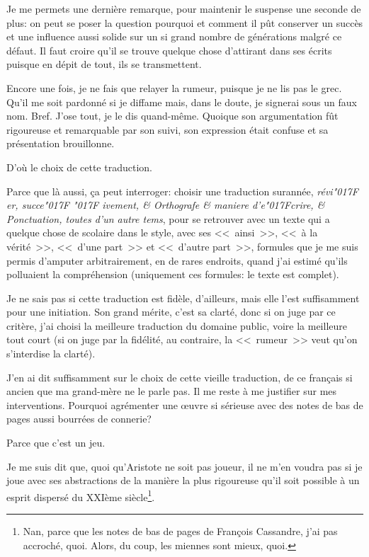 Je me permets une dernière remarque, pour maintenir le suspense une seconde de plus: on peut se poser la
question pourquoi et comment il pût conserver un succès et une influence aussi solide sur un si grand nombre
de générations malgré ce défaut. Il faut croire qu'il se trouve quelque chose d'attirant dans ses écrits
puisque en dépit de tout, ils se transmettent.

Encore une fois, je ne fais que relayer la rumeur, puisque je ne lis pas le grec. Qu'il me soit pardonné si je
diffame mais, dans le doute, je signerai sous un faux nom. Bref. J'ose tout, je le dis quand-même. Quoique son
argumentation fût rigoureuse et remarquable par son suivi, son expression était confuse et sa présentation
brouillonne. 

D'où le choix de cette traduction.

Parce que là aussi, ça peut interroger: choisir une traduction surannée, \emph{révi\char"017F er, succe\char"017F
\char"017F ivement, \& Orthografe \& maniere d'e\char"017F{}crire, \& Ponctuation, toutes d'un autre tems},
pour se retrouver avec un texte qui a
quelque chose de scolaire dans le style, avec ses <<~ainsi~>>, <<~à la vérité~>>, <<~d'une part~>> et <<~d'autre
part~>>, formules que je me suis permis d'amputer arbitrairement, en de rares endroits, quand j'ai estimé qu'ils
polluaient la compréhension (uniquement ces formules: le texte est complet).

Je ne sais pas si cette traduction est fidèle, d'ailleurs, mais elle l'est suffisamment pour une initiation. Son
grand mérite, c'est sa clarté, donc si on juge par ce critère, j'ai choisi la meilleure traduction du domaine public,
voire la meilleure tout court (si on juge par la fidélité, au contraire, la <<~rumeur~>> veut qu'on s'interdise la
clarté).

J'en ai dit suffisamment sur le choix de cette vieille traduction, de ce français si ancien que ma grand-mère ne
le parle pas. Il me reste à me justifier sur mes interventions. Pourquoi agrémenter une œuvre si sérieuse avec
des notes de bas de pages aussi bourrées de connerie?

Parce que c'est un jeu.

Je me suis dit que, quoi qu'Aristote ne soit pas joueur, il ne m'en voudra pas si je joue avec ses abstractions de la
manière la plus rigoureuse qu'il soit possible à un esprit dispersé du XXIème siècle\footnote{Nan, parce que les notes
de bas de pages de François Cassandre, j'ai pas accroché, quoi. Alors, du coup, les miennes sont mieux, quoi.}.

